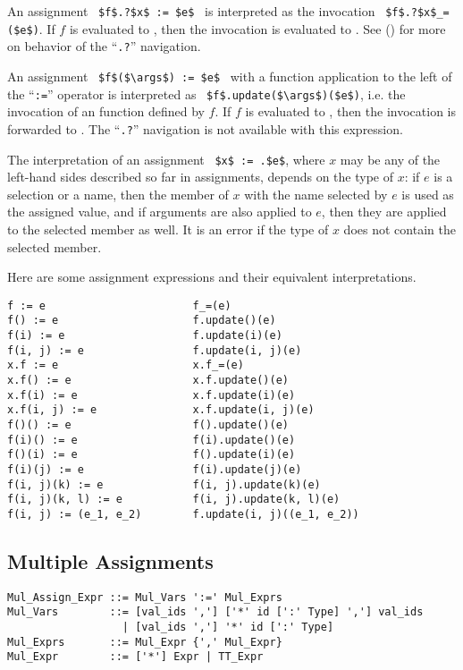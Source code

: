 An assignment ~\lstinline!$f$.?$x$ := $e$!~ is interpreted as the invocation ~\lstinline!$f$.?$x$_=($e$)!. If $f$ is evaluated to , then the invocation is evaluated to . See () for more on behavior of the ``\lstinline!.?!'' navigation. 

An assignment ~\lstinline!$f$($\args$) := $e$!~ with a function application to the left of the ``\lstinline!:=!'' operator is interpreted as ~\lstinline!$f$.update($\args$)($e$)!, i.e. the invocation of an  function defined by $f$. If $f$ is evaluated to , then the invocation is forwarded to . The ``\lstinline!.?!'' navigation is not available with this expression. 

The interpretation of an assignment ~\lstinline!$x$ := .$e$!, where $x$ may be any of the left-hand sides described so far in assignments, depends on the type of $x$: if $e$ is a selection or a name, then the member of $x$ with the name selected by $e$ is used as the assigned value, and if arguments are also applied to $e$, then they are applied to the selected member as well. It is an error if the type of $x$ does not contain the selected member. 

\example Here are some assignment expressions and their equivalent interpretations. 
\begin{lstlisting}
f := e                       f_=(e)
f() := e                     f.update()(e)
f(i) := e                    f.update(i)(e)
f(i, j) := e                 f.update(i, j)(e)
x.f := e                     x.f_=(e)
x.f() := e                   x.f.update()(e)
x.f(i) := e                  x.f.update(i)(e)
x.f(i, j) := e               x.f.update(i, j)(e)
f()() := e                   f().update()(e)
f(i)() := e                  f(i).update()(e)
f()(i) := e                  f().update(i)(e)
f(i)(j) := e                 f(i).update(j)(e)
f(i, j)(k) := e              f(i, j).update(k)(e)
f(i, j)(k, l) := e           f(i, j).update(k, l)(e)
f(i, j) := (e_1, e_2)        f.update(i, j)((e_1, e_2))
\end{lstlisting}






\subsection{Multiple Assignments}
\label{sec:multiple-assignments}

\syntax\begin{lstlisting}
Mul_Assign_Expr ::= Mul_Vars ':=' Mul_Exprs
Mul_Vars        ::= [val_ids ','] ['*' id [':' Type] ','] val_ids
                  | [val_ids ','] '*' id [':' Type]
Mul_Exprs       ::= Mul_Expr {',' Mul_Expr}
Mul_Expr        ::= ['*'] Expr | TT_Expr
\end{lstlisting}

